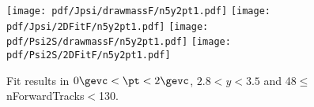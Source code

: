 \begin{figure}[H]
\begin{center}
\texttt{[image: pdf/Jpsi/drawmassF/n5y2pt1.pdf]}
\texttt{[image: pdf/Jpsi/2DFitF/n5y2pt1.pdf]}
\vspace*{-0.5cm}
\texttt{[image: pdf/Psi2S/drawmassF/n5y2pt1.pdf]}
\texttt{[image: pdf/Psi2S/2DFitF/n5y2pt1.pdf]}
\vspace*{-0.5cm}
\end{center}
\caption{Fit results in $0\gevc<\pt<2\gevc$, $2.8<y<3.5$ and 48$\leq$nForwardTracks$<$130.}
\label{Fitn5y2pt1}
\end{figure}
